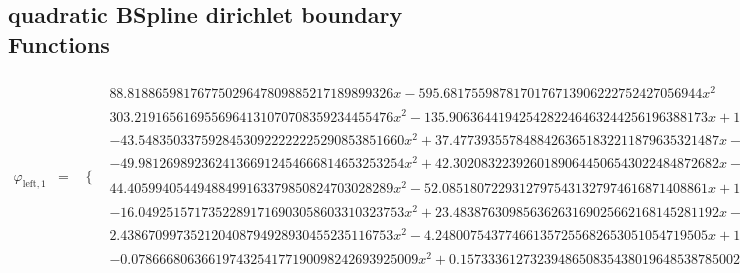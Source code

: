 \documentclass{article}
\begin{document}
 \begin{landscape}
 \subsection{quadratic BSpline dirichlet boundary Functions}
 \begin{eqnarray*}
 \varphi_{\text{left},1} & = & \begin{array}{cc}
 \{ & 
\begin{array}{cc}
 88.81886598176775029647809885217189899326 x-595.6817559878170176713906222752427056944 x^2 & x\geq 0\land x<\frac{1}{8} \\
 303.2191656169556964131070708359234455476 x^2-135.9063644194254282246463244256196388173 x+14.04532690007457365757027645486197111316 & x\geq \frac{1}{8}\land x<\frac{1}{4} \\
 -43.54835033759284530922222225290853851660 x^2+37.47739355784884263651832211879635321487 x-7.627642847084710200075304363190027890858 & x\geq \frac{1}{4}\land x<\frac{3}{8} \\
 -49.98126989236241366912454666814653253254 x^2+42.30208322392601890644506543022484872682 x-8.532272159474180750686568734082870799350 & x\geq \frac{3}{8}\land x<\frac{1}{2} \\
 44.40599405449488499163379850824703028289 x^2-52.08518072293127975431327974616871408861 x+15.06454382724014391450301756001551990451 & x\geq \frac{1}{2}\land x<\frac{5}{8} \\
 -16.04925157173522891716903058603310323753 x^2+23.48387630985636263169025662168145281192 x-8.550786495505994331123087554937657251907 & x\geq \frac{5}{8}\land x<\frac{3}{4} \\
 2.438670997352120408794928930455235116753 x^2-4.248007543774661357255682653051054719505 x+1.848669949605639664731639673087033072377 & x\geq \frac{3}{4}\land x<\frac{7}{8} \\
 -0.07866680636619743254177190098242693925009 x^2+0.1573336127323948650835438019648538785002 x-0.07866680636619743254177190098242693925009 & x\geq \frac{7}{8}\land x<1
\end{array}


\end{array}
\end{eqnarray*}
\end{landscape}
\end{document}
